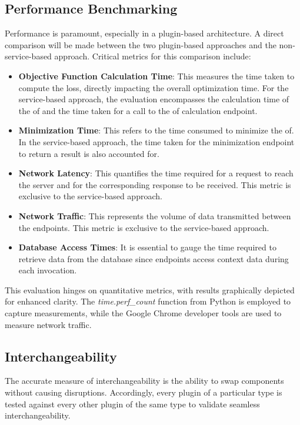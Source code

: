 \documentclass[
  a4paper,  %
  twoside,  %
  bibliography=totoc,
  headsepline,
  cleardoublepage=empty,
  parskip=half,
  draft=false
]{scrbook}
\begin{document}
\subsection{Performance Benchmarking}
\label{subsec:performanceBenchmarking}
Performance is paramount, especially in a plugin-based architecture.
A direct comparison will be made between the two plugin-based approaches and the non-service-based approach.
Critical metrics for this comparison include:

\begin{itemize}
\item \textbf{Objective Function Calculation Time}: This measures the time taken to compute the loss, directly impacting the overall optimization time.
For the service-based approach, the evaluation encompasses the calculation time of the \gls{of} and the time taken for a call to the \gls{of} calculation endpoint.

\item \textbf{Minimization Time}: This refers to the time consumed to minimize the \gls{of}.
In the service-based approach, the time taken for the minimization endpoint to return a result is also accounted for.

\item \textbf{Network Latency}: This quantifies the time required for a request to reach the server and for the corresponding response to be received.
This metric is exclusive to the service-based approach.

\item \textbf{Network Traffic}: This represents the volume of data transmitted between the endpoints.
This metric is exclusive to the service-based approach.

\item \textbf{Database Access Times}: It is essential to gauge the time required to retrieve data from the database since endpoints access context data during each invocation.
\end{itemize}

This evaluation hinges on quantitative metrics, with results graphically depicted for enhanced clarity.
The \emph{time.perf\_count} function from Python is employed to capture measurements, while the Google Chrome developer tools are used to measure network traffic.

\subsection{Interchangeability}
The accurate measure of interchangeability is the ability to swap components without causing disruptions.
Accordingly, every plugin of a particular type is tested against every other plugin of the same type to validate seamless interchangeability.
\end{document}
